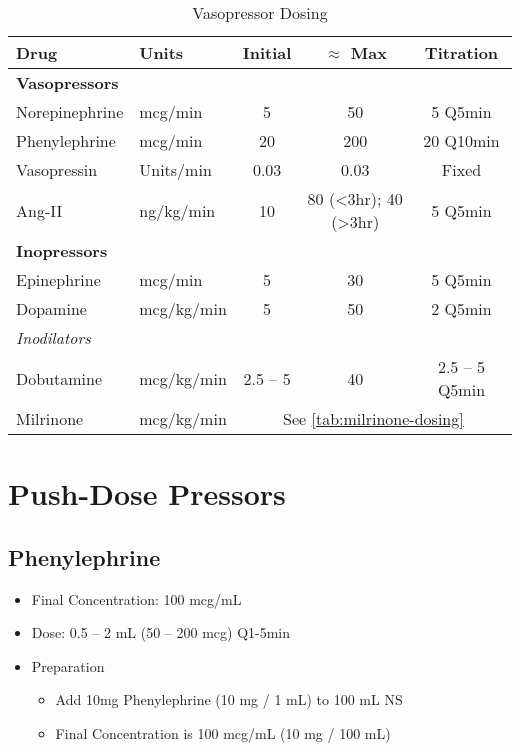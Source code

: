 \documentclass[main.tex]{subfiles}
\begin{document}
\begin{table*}[hbt]
\centering
\caption{Vasopressor Dosing \autocite{overgaardInotropesVasopressorsReview2008a,jentzerPharmacotherapyUpdateUse2015b}}
\label{tab:vasopressor-dosing}
\begin{tabular}{l l c c c}
	\textbf{Drug} & \textbf{Units} & \textbf{Initial} & \textbf{$\mathbf{\approx}$ Max} & \textbf{Titration}\\ \hline
	\multicolumn{5}{l}{\textbf{Vasopressors}} \\
	Norepinephrine & \si{mcg/min} & 5 & 50 & 5 Q5min \\
	Phenylephrine & \si{mcg/min} &  20 & 200 & 20 Q10min \\
	Vasopressin & \si{Units/min} & 0.03 & 0.03 & Fixed \\
	Ang-II & \si{ng/kg/min} & 10 & 80 (\textless 3hr); 40 (\textgreater 3hr)& 5 Q5min \\
	\multicolumn{5}{l}{\textbf{Inopressors}}\\
	Epinephrine & \si{mcg/min} & 5 & 30 & 5 Q5min \\
	Dopamine & \si{mcg/kg/min} & 5 & 50 & 2 Q5min\\
	\multicolumn{5}{l}{\textit{Inodilators}}\\
	Dobutamine & \si{mcg/kg/min} & 2.5 -- 5 & 40 & 2.5 -- 5 Q5min \\
	Milrinone & \si{mcg/kg/min} & \multicolumn{3}{c}{See \autoref{tab:milrinone-dosing}} \\
\end{tabular}
\end{table*}

\section{Push-Dose Pressors\autocite{weingartPushdosePressorsImmediate2015a}}
\subsection{Phenylephrine}
\begin{itemize}[noitemsep]
	\item Final Concentration: 100 \si{mcg/mL}
	\item Dose: 0.5 -- 2 \si{mL} (50 -- 200 \si{mcg}) Q1-5min
	\item Preparation
	\begin{itemize}[noitemsep]
		\item Add 10\si{mg} Phenylephrine (10 \si{mg} / 1 \si{mL}) to 100 \si{mL} NS
		\item Final Concentration is 100 \si{mcg/mL} (10 \si{mg} / 100 \si{mL})
	\end{itemize}
\end{itemize}
\end{document}
